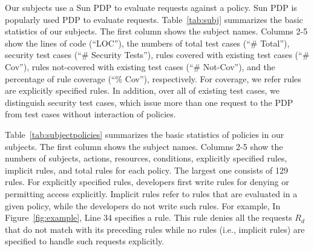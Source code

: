 Our subjects use a Sun PDP \cite{sun05:xacml} to evaluate requests against a policy.
Sun PDP is popularly used PDP to evaluate requests.
Table~\ref{tab:subj} summarizes the basic statistics of our subjects. The first column shows the subject names.
Columns 2-5 show the lines of code (``LOC''), the numbers of total test cases (``\# Total''), security test cases (``\# Security Tests''),
rules covered with existing test cases (``\# Cov''), rules not-covered with existing test cases (``\# Not-Cov''), and the percentage
of rule coverage (``\% Cov''), respectively. For coverage, we refer rules are explicitly specified rules.
In addition, over all of existing test cases, we distinguish security test cases, which issue
more than one request to the PDP from test cases without interaction of policies.

Table~\ref{tab:subjectpolicies} summarizes the basic statistics of policies in our subjects.
The first column shows the subject names.
Columns 2-5 show the numbers of subjects, actions, resources, conditions, explicitly specified rules, implicit
 rules, and total rules for each policy.
The largest one consists of 129 rules.
For explicitly specified rules, developers first write rules for denying or permitting access
explicitly. Implicit rules refer to rules that are evaluated in a given policy, while the developers do not write such rules.
For example, In Figure~\ref{fig:example}, Line 34
specifies a rule. This rule denies all the requests $R_d$ that do not match with its preceding rules while
no rules (i.e., implicit rules) are specified to handle such requests explicitly.

